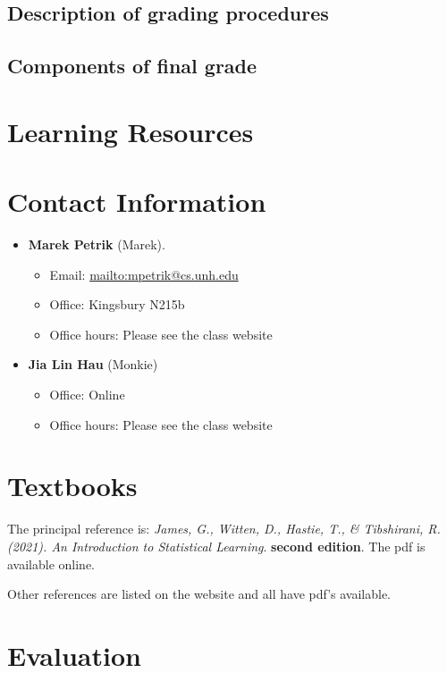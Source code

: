 \documentclass[11pt]{article}
\begin{document}
\subsection{Description of grading procedures}

\subsection{Components of final grade}

\section{Learning Resources}

\section{Contact Information}

\begin{itemize}[nosep]
	\item \textbf{Marek Petrik} (Marek).
	\begin{itemize}
		\item Email: \url{mailto:mpetrik@cs.unh.edu}
		\item Office:  Kingsbury N215b
		\item Office hours:  Please see the class website
	\end{itemize}
	\item \textbf{Jia Lin Hau} (Monkie)
	\begin{itemize}
		\item Office: Online
		\item Office hours: Please see the class website
	\end{itemize}
\end{itemize}


\section{Textbooks}

The principal reference is: \emph{James, G., Witten, D., Hastie, T., \& Tibshirani, R. (2021). An Introduction to Statistical Learning}. \textbf{second edition}. The pdf is available online.

Other references are listed on the website and all have pdf's available.

\section{Evaluation}
\end{document}
